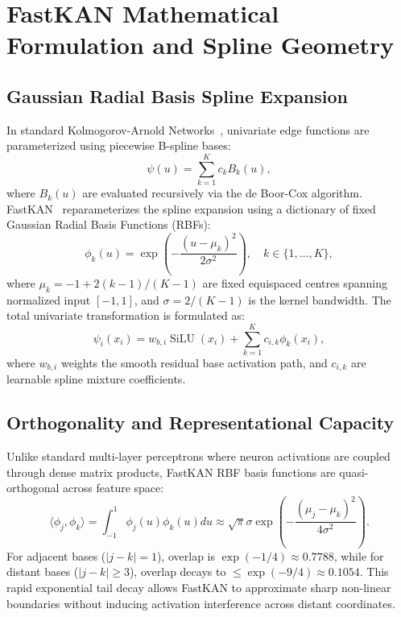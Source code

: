 \documentclass[conference]{IEEEtran}
\begin{document}
\appendices

\section{FastKAN Mathematical Formulation and Spline Geometry}
\label{app:kan_proof}
\begingroup
\setlength{\abovedisplayskip}{4pt plus 1pt minus 1pt}
\setlength{\belowdisplayskip}{4pt plus 1pt minus 1pt}
\setlength{\abovedisplayshortskip}{2pt}
\setlength{\belowdisplayshortskip}{2pt}

\subsection{Gaussian Radial Basis Spline Expansion}
In standard Kolmogorov-Arnold Networks~\cite{liu2024kan}, univariate edge functions are parameterized using piecewise B-spline bases:
\begin{equation}
\psi(u) = \sum_{k=1}^K c_k B_k(u),
\label{eq:bspline}
\end{equation}
where $B_k(u)$ are evaluated recursively via the de Boor-Cox algorithm. FastKAN~\cite{li2024fastkan} reparameterizes the spline expansion using a dictionary of fixed Gaussian Radial Basis Functions (RBFs):
\begin{equation}
\phi_k(u) = \exp\!\left(-\frac{(u - \mu_k)^2}{2\sigma^2}\right), \quad k \in \{1, \dots, K\},
\label{eq:rbf_basis}
\end{equation}
where $\mu_k = -1 + 2(k-1)/(K-1)$ are fixed equispaced centres spanning normalized input $[-1, 1]$, and $\sigma = 2/(K-1)$ is the kernel bandwidth.
The total univariate transformation is formulated as:
\begin{equation}
\psi_i(x_i) = w_{b,i} \operatorname{SiLU}(x_i) + \sum_{k=1}^K c_{i,k} \phi_k(x_i),
\label{eq:fastkan_layer}
\end{equation}
where $w_{b,i}$ weights the smooth residual base activation path, and $c_{i,k}$ are learnable spline mixture coefficients.

\subsection{Orthogonality and Representational Capacity}
Unlike standard multi-layer perceptrons where neuron activations are coupled through dense matrix products, FastKAN RBF basis functions are quasi-orthogonal across feature space:
\begin{equation}
\langle \phi_j, \phi_k \rangle = \int_{-1}^1 \phi_j(u)\phi_k(u) du \approx \sqrt{\pi}\sigma \exp\!\left(-\frac{(\mu_j - \mu_k)^2}{4\sigma^2}\right).
\label{eq:inner_prod}
\end{equation}
For adjacent bases ($|j - k| = 1$), overlap is $\exp(-1/4) \approx 0.7788$, while for distant bases ($|j - k| \ge 3$), overlap decays to $\le \exp(-9/4) \approx 0.1054$. This rapid exponential tail decay allows FastKAN to approximate sharp non-linear boundaries without inducing activation interference across distant coordinates.
\endgroup
\end{document}
